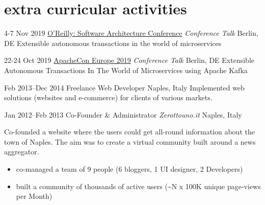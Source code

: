 \section{\normalfont extra curricular activities}
\begin{entrylist}


\entry
{4-7 Nov 2019}
{\href{https://conferences.oreilly.com/software-architecture/sa-eu/public/schedule/detail/78661
}{O'Reilly: Software Architecture Conference} {\normalfont \emph{Conference Talk}}}
{Berlin, DE}
{Extensible autonomous transactions in the world of microservices}

\entry
{22-24 Oct 2019}
{\href{https://aceu19.apachecon.com/session/extensible-autonomous-transactions-world-microservices-using-apache-kafka}{ApacheCon Europe 2019} {\normalfont \emph{Conference Talk}}}
{Berlin, DE}
{Extensible Autonomous Transactions In The World of Microservices using Apache Kafka}

\entry
{Feb 2013--Dec 2014}
{Freelance Web Developer}
{Naples, Italy}
{Implemented web solutions (websites and e-commerce) for clients of various markets.
}

\entry
{Jan 2012--Feb 2013}
{Co-Founder \& Administrator {\normalfont \emph{Zerottouno.it}}}
{Naples, Italy}
{Co-founded a website where the users could get all-round information about the town of Naples. The aim was to create a virtual community built around a news aggregator.  
\vspace{-.2cm}
\begin{itemize}[leftmargin=.6cm]
	\item co-managed a team of 9 people (6 bloggers, 1 UI designer, 2 Developers)
	\item built a community of thousands of active users (\textasciitilde N x 100K unique page-views per Month)	 
\end{itemize} 
}
\end{entrylist}